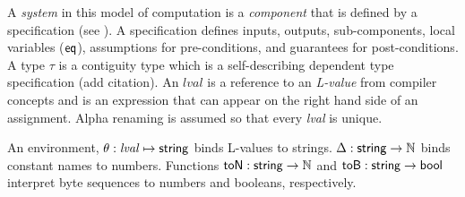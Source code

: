 A \emph{system} in this model of computation is a \emph{component} that is defined by a specification (see ). A specification defines inputs, outputs, sub-components, local variables ($\mathsf{eq}$), assumptions for pre-conditions, and guarantees for post-conditions. A type $\tau$ is a contiguity type which is a self-describing dependent type specification (add citation). An $\mathit{lval}$ is a reference to an \emph{L-value} from compiler concepts and is an expression that can appear on the right hand side of an assignment. Alpha renaming is assumed so that every \emph{lval} is unique.

An environment, $\theta: \mathit{lval} \mapsto \mathsf{string}$ binds L-values to strings. $\Delta : \mathsf{string} \to \mathbb{N}$ binds constant names to numbers. Functions $\mathsf{toN}:\mathsf{string}\to\mathbb{N}$ and $\mathsf{toB}:\mathsf{string}\to\mathsf{bool}$ interpret byte sequences to numbers and booleans, respectively. 

